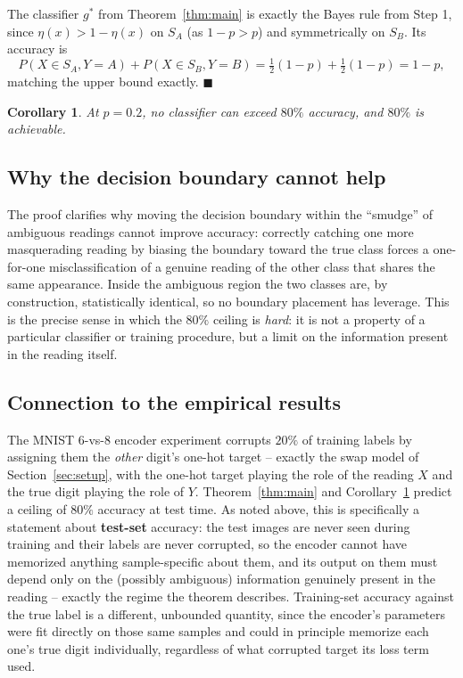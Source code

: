\documentclass[11pt]{article}
\newtheorem{corollary}{Corollary}
\begin{document}
The classifier $g^\ast$ from Theorem~\ref{thm:main} is exactly the Bayes
rule from Step 1, since $\eta(x) > 1-\eta(x)$ on $S_A$ (as $1-p > p$) and
symmetrically on $S_B$. Its accuracy is
\[
  P(X \in S_A, Y=A) + P(X \in S_B, Y=B)
  = \tfrac12(1-p) + \tfrac12(1-p) = 1-p,
\]
matching the upper bound exactly. $\blacksquare$

\begin{corollary}
\label{cor:twenty}
At $p = 0.2$, no classifier can exceed $80\%$ accuracy, and $80\%$ is
achievable.
\end{corollary}

\subsection{Why the decision boundary cannot help}

The proof clarifies why moving the decision boundary within the ``smudge''
of ambiguous readings cannot improve accuracy: correctly catching one more
masquerading reading by biasing the boundary toward the true class forces a
one-for-one misclassification of a genuine reading of the other class that
shares the same appearance. Inside the ambiguous region the two classes are,
by construction, statistically identical, so no boundary placement has
leverage. This is the precise sense in which the $80\%$ ceiling is
\emph{hard}: it is not a property of a particular classifier or training
procedure, but a limit on the information present in the reading itself.

\subsection{Connection to the empirical results}
\label{sec:empirical}

The MNIST 6-vs-8 encoder experiment corrupts $20\%$ of training labels by
assigning them the \emph{other} digit's one-hot target -- exactly the swap
model of Section~\ref{sec:setup}, with the one-hot target playing the role
of the reading $X$ and the true digit playing the role of $Y$.
Theorem~\ref{thm:main} and Corollary~\ref{cor:twenty} predict a ceiling of
$80\%$ accuracy at test time. As noted above, this is specifically a
statement about \textbf{test-set} accuracy: the test images are never seen
during training and their labels are never corrupted, so the encoder cannot
have memorized anything sample-specific about them, and its output on them
must depend only on the (possibly ambiguous) information genuinely present
in the reading -- exactly the regime the theorem describes. Training-set
accuracy against the true label is a different, unbounded quantity, since
the encoder's parameters were fit directly on those same samples and could
in principle memorize each one's true digit individually, regardless of
what corrupted target its loss term used.
\end{document}
